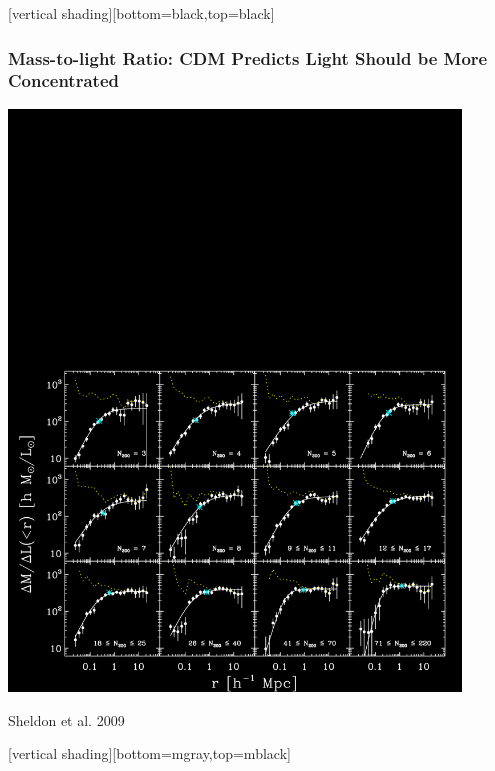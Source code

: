 \documentclass{beamer}
\begin{document}

{
    [vertical shading][bottom=black,top=black]


    \frame
    {
        \frametitle{Mass-to-light Ratio: CDM Predicts Light Should be More Concentrated}

        \begin{center}
            \includegraphics[trim=0 0 0 800,clip,width=0.9\textwidth]{m2l-ngals200_12-m21-22-l4-m2lfits-color.png}
        \end{center}
        \hfill {\color{gold} Sheldon et al. 2009}
    }
    [vertical shading][bottom=mgray,top=mblack]
}
\end{document}
